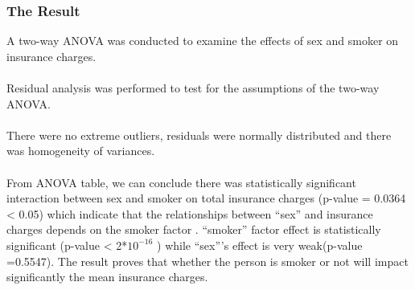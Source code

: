 \documentclass[a4paper]{article}
\begin{document}
\subsubsection{The Result}
A two-way ANOVA was conducted to examine the effects of sex and smoker on insurance charges. \\ \\
Residual analysis was performed to test for the assumptions of the two-way ANOVA. \\ \\
There were no extreme outliers, residuals were normally distributed and there was homogeneity of variances. \\ \\
From ANOVA table, we can conclude there was statistically significant interaction between sex and smoker on total insurance charges (p-value = 0.0364 < 0.05) which indicate that the relationships between “sex” and insurance charges depends on the smoker factor . “smoker” factor effect is statistically significant (p-value < 2*$10^{-16}$ ) while “sex”’s effect is very weak(p-value =0.5547). The result proves that whether the person is smoker or not will impact significantly the mean insurance charges.


\newpage
\end{document}

